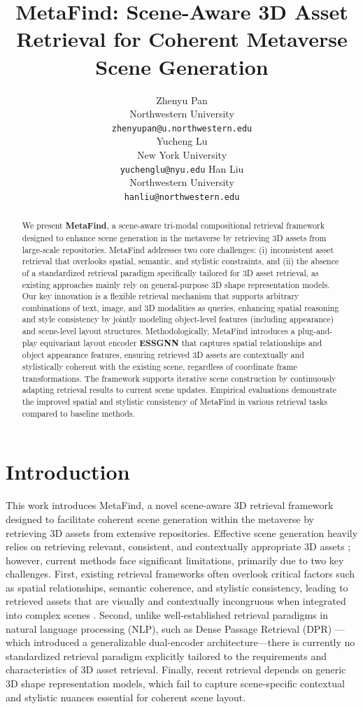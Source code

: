 \documentclass{article}
\title{MetaFind: Scene-Aware 3D Asset Retrieval for Coherent Metaverse Scene Generation}
\author{%
  Zhenyu Pan\\
  Northwestern University\\
  \texttt{zhenyupan@u.northwestern.edu} \\
  \And
  Yucheng Lu\\
  New York University\\
  \texttt{yuchenglu@nyu.edu}   
  \And
  Han Liu\\
  Northwestern University\\
  \texttt{hanliu@northwestern.edu} \\
}
\begin{document}
\maketitle


\begin{abstract}
We present \textbf{MetaFind}, a scene-aware tri-modal compositional retrieval framework designed to enhance scene generation in the metaverse by retrieving 3D assets from large-scale repositories. MetaFind addresses two core challenges: (i) inconsistent asset retrieval that overlooks spatial, semantic, and stylistic constraints, and (ii) the absence of a standardized retrieval paradigm specifically tailored for 3D asset retrieval, as existing approaches mainly rely on general-purpose 3D shape representation models. Our key innovation is a flexible retrieval mechanism that supports arbitrary combinations of text, image, and 3D modalities as queries, enhancing spatial reasoning and style consistency by jointly modeling object-level features (including appearance) and scene-level layout structures. Methodologically, MetaFind introduces a plug-and-play equivariant layout encoder \textbf{ESSGNN} that captures spatial relationships and object appearance features, ensuring retrieved 3D assets are contextually and stylistically coherent with the existing scene, regardless of coordinate frame transformations. The framework supports iterative scene construction by continuously adapting retrieval results to current scene updates. Empirical evaluations demonstrate the improved spatial and stylistic consistency of MetaFind in various retrieval tasks compared to baseline methods.

\end{abstract}

\section{Introduction}
\label{sec:introduction}
This work introduces MetaFind, a novel scene-aware 3D retrieval framework designed to facilitate coherent scene generation within the metaverse by retrieving 3D assets from extensive repositories. Effective scene generation heavily relies on retrieving relevant, consistent, and contextually appropriate 3D assets \cite{sun2024layoutvlm}; however, current methods face significant limitations, primarily due to two key challenges. First, existing retrieval frameworks often overlook critical factors such as spatial relationships, semantic coherence, and stylistic consistency, leading to retrieved assets that are visually and contextually incongruous when integrated into complex scenes \cite{liu2023openshape}. Second, unlike well-established retrieval paradigms in natural language processing (NLP), such as Dense Passage Retrieval (DPR) \cite{karpukhin2020dense}—which introduced a generalizable dual-encoder architecture—there is currently no standardized retrieval paradigm explicitly tailored to the requirements and characteristics of 3D asset retrieval. Finally, recent retrieval depends on generic 3D shape representation models, which fail to capture scene-specific contextual and stylistic nuances essential for coherent scene layout. 
\end{document}
